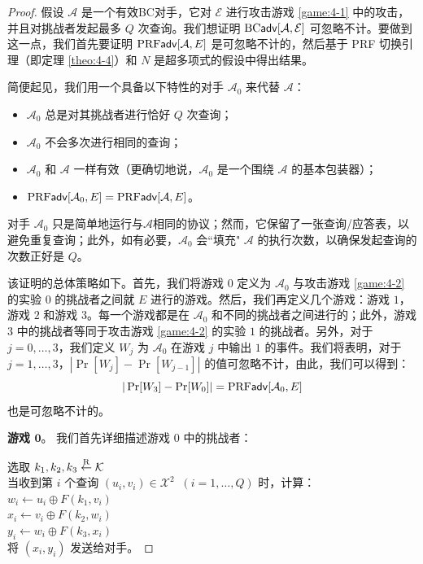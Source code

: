 \begin{proof}
假设 $\mathcal{A}$ 是一个有效BC对手，它对 $\mathcal{E}$ 进行攻击游戏 \ref{game:4-1} 中的攻击，并且对挑战者发起最多 $Q$ 次查询。我们想证明 ${\rm BC\mathsf{adv}}[\mathcal{A},\mathcal{E}]$ 可忽略不计。要做到这一点，我们首先要证明 ${\rm PRF\mathsf{adv}}[\mathcal{A}, E]$ 是可忽略不计的，然后基于 PRF 切换引理（即定理 \ref{theo:4-4}）和 $N$ 是超多项式的假设中得出结果。

简便起见，我们用一个具备以下特性的对手 $\mathcal{A}_0$ 来代替 $\mathcal{A}$：
\begin{itemize}
	\item $\mathcal{A}_0$ 总是对其挑战者进行恰好 $Q$ 次查询；
	\item $\mathcal{A}_0$ 不会多次进行相同的查询；
	\item $\mathcal{A}_0$ 和 $\mathcal{A}$ 一样有效（更确切地说，$\mathcal{A}_0$ 是一个围绕 $\mathcal{A}$ 的基本包装器）；
	\item ${\rm PRF\mathsf{adv}}[\mathcal{A}_0, E]={\rm PRF\mathsf{adv}}[\mathcal{A}, E]$。
\end{itemize}
对手 $\mathcal{A}_0$ 只是简单地运行与$\mathcal{A}$相同的协议；然而，它保留了一张查询/应答表，以避免重复查询；此外，如有必要，$\mathcal{A}_0$ 会``填充" $\mathcal{A}$ 的执行次数，以确保发起查询的次数正好是 $Q$。

该证明的总体策略如下。首先，我们将游戏 $0$ 定义为 $\mathcal{A}_0$ 与攻击游戏 \ref{game:4-2} 的实验 $0$ 的挑战者之间就 $E$ 进行的游戏。然后，我们再定义几个游戏：游戏 $1$，游戏 $2$ 和游戏 $3$。每一个游戏都是在 $\mathcal{A}_0$ 和不同的挑战者之间进行的；此外，游戏 $3$ 中的挑战者等同于攻击游戏 \ref{game:4-2} 的实验 $1$ 的挑战者。另外，对于 $j=0,\dots,3$，我们定义 $W_j$ 为 $\mathcal{A}_0$ 在游戏 $j$ 中输出 $1$ 的事件。我们将表明，对于 $j=1,\dots,3$，$|\Pr[W_j]-\Pr[W_{j-1}]|$ 的值可忽略不计，由此，我们可以得到：
\[
|\Pr[W_3]-\Pr[W_0]|={\rm PRF\mathsf{adv}}[\mathcal{A}_0, E]
\]
也是可忽略不计的。

\vspace{5pt}

\noindent
\textbf{游戏 $\mathbf{0}$}。
我们首先详细描述游戏 $0$ 中的挑战者：

\vspace{5pt}

\hspace*{5pt} 选取 $k_1,k_2,k_3\overset{\rm R}\leftarrow\mathcal{K}$\\
\hspace*{26pt} 当收到第 $i$ 个查询 $(u_i,v_i)\in\mathcal{X}^2\;\;(i=1,\dots,Q)$ 时，计算：\\
\hspace*{50pt} $w_i\leftarrow u_i\oplus F(k_1,v_i)$\\
\hspace*{50pt} $x_i\leftarrow v_i\oplus F(k_2,w_i)$\\
\hspace*{50pt} $y_i\leftarrow w_i\oplus F(k_3,x_i)$\\
\hspace*{50pt} 将 $(x_i,y_i)$ 发送给对手。


\end{proof}
